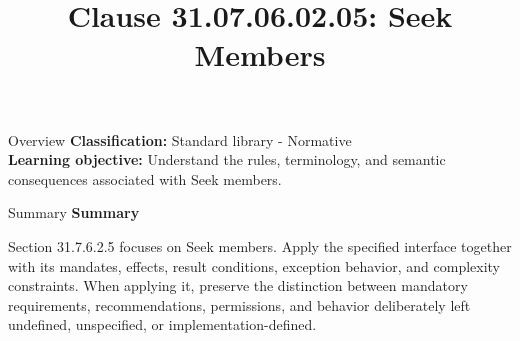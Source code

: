 \documentclass[10pt,letterpaper]{article}
\title{Clause 31.07.06.02.05: Seek Members}
\author{}
\date{}
\begin{document}
\maketitle
\begin{CornellOverviewBox}{Overview}
\textbf{Classification:} Standard library - Normative\\[2pt]
\textbf{Learning objective:} Understand the rules, terminology, and semantic consequences associated with Seek members.
\end{CornellOverviewBox}\begin{CornellSummaryBox}{Summary}
{\sffamily\bfseries\color{Accent} Summary}\par\vspace{3pt}Section 31.7.6.2.5 focuses on Seek members. Apply the specified interface together with its mandates, effects, result conditions, exception behavior, and complexity constraints. When applying it, preserve the distinction between mandatory requirements, recommendations, permissions, and behavior deliberately left undefined, unspecified, or implementation-defined.
\end{CornellSummaryBox}
\end{document}
